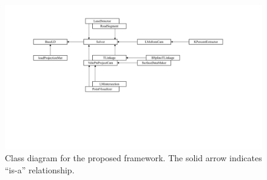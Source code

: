 \documentclass[a4paper]{article}
\begin{document}
\begin{figure}
	\centering
	\includegraphics[width=0.9\columnwidth, viewport= 103 213 816 495, clip = true]{figure/classdiagrampptx.pdf}
	\caption{Class diagram for the proposed framework. The solid arrow indicates ``is-a'' relationship.}
	\label{fig:classes}
\end{figure}
\end{document}
